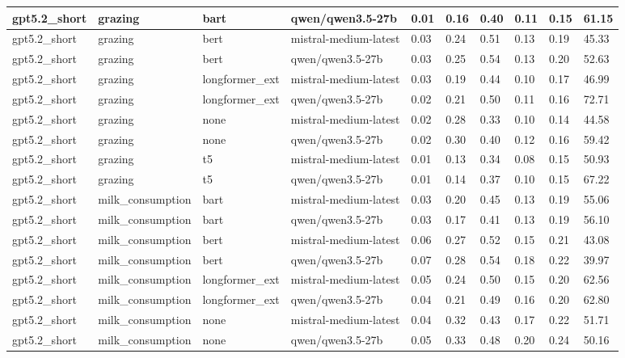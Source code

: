 \begin{tabular}{|l|l|l|l|l|l|l|l|l|l|}
 \hline
 gpt5.2\_short & grazing & bart & qwen/qwen3.5-27b & 0.01 & 0.16 & 0.40 & 0.11 & 0.15 & 61.15 \\
 \hline
 gpt5.2\_short & grazing & bert & mistral-medium-latest & 0.03 & 0.24 & 0.51 & 0.13 & 0.19 & 45.33 \\
 \hline
 gpt5.2\_short & grazing & bert & qwen/qwen3.5-27b & 0.03 & 0.25 & 0.54 & 0.13 & 0.20 & 52.63 \\
 \hline
 gpt5.2\_short & grazing & longformer\_ext & mistral-medium-latest & 0.03 & 0.19 & 0.44 & 0.10 & 0.17 & 46.99 \\
 \hline
 gpt5.2\_short & grazing & longformer\_ext & qwen/qwen3.5-27b & 0.02 & 0.21 & 0.50 & 0.11 & 0.16 & 72.71 \\
 \hline
 gpt5.2\_short & grazing & none & mistral-medium-latest & 0.02 & 0.28 & 0.33 & 0.10 & 0.14 & 44.58 \\
 \hline
 gpt5.2\_short & grazing & none & qwen/qwen3.5-27b & 0.02 & 0.30 & 0.40 & 0.12 & 0.16 & 59.42 \\
 \hline
 gpt5.2\_short & grazing & t5 & mistral-medium-latest & 0.01 & 0.13 & 0.34 & 0.08 & 0.15 & 50.93 \\
 \hline
 gpt5.2\_short & grazing & t5 & qwen/qwen3.5-27b & 0.01 & 0.14 & 0.37 & 0.10 & 0.15 & 67.22 \\
 \hline
 gpt5.2\_short & milk\_consumption & bart & mistral-medium-latest & 0.03 & 0.20 & 0.45 & 0.13 & 0.19 & 55.06 \\
 \hline
 gpt5.2\_short & milk\_consumption & bart & qwen/qwen3.5-27b & 0.03 & 0.17 & 0.41 & 0.13 & 0.19 & 56.10 \\
 \hline
 gpt5.2\_short & milk\_consumption & bert & mistral-medium-latest & 0.06 & 0.27 & 0.52 & 0.15 & 0.21 & 43.08 \\
 \hline
 gpt5.2\_short & milk\_consumption & bert & qwen/qwen3.5-27b & 0.07 & 0.28 & 0.54 & 0.18 & 0.22 & 39.97 \\
 \hline
 gpt5.2\_short & milk\_consumption & longformer\_ext & mistral-medium-latest & 0.05 & 0.24 & 0.50 & 0.15 & 0.20 & 62.56 \\
 \hline
 gpt5.2\_short & milk\_consumption & longformer\_ext & qwen/qwen3.5-27b & 0.04 & 0.21 & 0.49 & 0.16 & 0.20 & 62.80 \\
 \hline
 gpt5.2\_short & milk\_consumption & none & mistral-medium-latest & 0.04 & 0.32 & 0.43 & 0.17 & 0.22 & 51.71 \\
 \hline
 gpt5.2\_short & milk\_consumption & none & qwen/qwen3.5-27b & 0.05 & 0.33 & 0.48 & 0.20 & 0.24 & 50.16 \\

\end{tabular}
